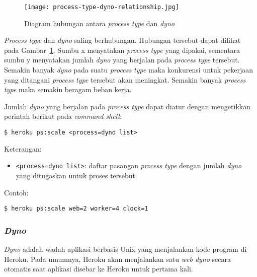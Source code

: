 \begin{figure}[H]
	\centering  
	\texttt{[image: process-type-dyno-relationship.jpg]}  
	\caption[Diagram hubungan antara \textit{process type} dan \textit{dyno}]{Diagram hubungan antara \textit{process type} dan \textit{dyno}} 
	\label{fig:process-type-dyno-relationship} 
\end{figure}

\textit{Process type} dan \textit{dyno} saling berhubungan. Hubungan tersebut dapat dilihat pada Gambar~\ref{fig:process-type-dyno-relationship}. Sumbu x menyatakan \textit{process type} yang dipakai, sementara sumbu y menyatakan jumlah \textit{dyno} yang berjalan pada \textit{process type} tersebut. Semakin banyak \textit{dyno} pada suatu \textit{process type} maka konkurensi untuk pekerjaan yang ditangani \textit{process type} tersebut akan meningkat. Semakin banyak \textit{process type} maka semakin beragam beban kerja.

Jumlah \textit{dyno} yang berjalan pada \textit{process type} dapat diatur dengan mengetikkan perintah berikut pada \textit{command shell}:
\begin{lstlisting}
$ heroku ps:scale <process=dyno list>
\end{lstlisting}
Keterangan:
\begin{itemize}
\item \texttt{<process=dyno list>}: daftar pasangan \textit{process type} dengan jumlah \textit{dyno} yang ditugaskan untuk proses tersebut.
\end{itemize}

Contoh: 
\begin{lstlisting}
$ heroku ps:scale web=2 worker=4 clock=1
\end{lstlisting}

\subsubsection{\textit{Dyno}}
\textit{Dyno} adalah wadah aplikasi berbasis Unix yang  menjalankan kode program di Heroku. Pada umumnya, Heroku akan menjalankan satu \textit{web dyno} secara otomatis saat aplikasi disebar ke Heroku untuk pertama kali.


